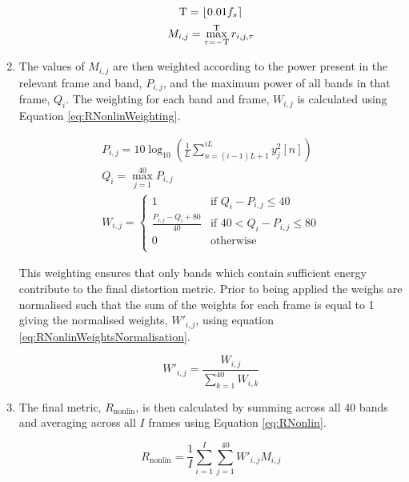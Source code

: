 \begin{enumerate}
					\begin{gather}
						\mathrm{T} = \left\lfloor0.01f_{s}\right\rceil \nonumber \\
						M_{i,j} = \max_{\tau = -\mathrm{T}}^{\mathrm{T}} r_{i,j,\tau}
						\label{eq:RNonlinMaxCrossCorrelation}
					\end{gather}

				\item The values of $M_{i,j}$ are then weighted according to the power present in the
					relevant frame and band, $P_{i,j}$, and the maximum power of all bands in that
					frame, $Q_{i}$. The weighting for each band and frame, $W_{i,j}$ is calculated using
					Equation \ref{eq:RNonlinWeighting}.

					\begin{gather}
						P_{i,j} = 10\log_{10} \left( \frac{1}{L} 
							\sum_{n=(i-1)L+1}^{iL} y_{j}^{2}[n]\right) \nonumber \\
						Q_{i} = \max_{j = 1}^{40} P_{i,j} \nonumber \\
						W_{i,j} = \begin{cases}
							1 & \text{if $Q_{i} - P_{i,j} \leq 40$} \\
							\frac{P_{i,j} - Q_{i} + 80}{40} & 
								\text{if $40 < Q_{i} - P_{i,j} \leq 80$} \\
							0 & \text{otherwise} \\
						\end{cases}
						\label{eq:RNonlinWeighting}
					\end{gather}

					This weighting ensures that only bands which contain sufficient energy contribute to
					the final distortion metric. Prior to being applied the weighs are normalised such
					that the sum of the weights for each frame is equal to 1 giving the normalised
					weights, $W'_{i,j}$, using equation \ref{eq:RNonlinWeightsNormalisation}.

					\begin{equation}
						W'_{i,j} = \frac{W_{i, j}}{\sum_{k = 1}^{40} W_{i,k}}
						\label{eq:RNonlinWeightsNormalisation}
					\end{equation}

				\item The final metric, $R_{\mathrm{nonlin}}$, is then calculated by summing across all 40
					bands and averaging across all $I$ frames using Equation \ref{eq:RNonlin}.

					\begin{equation}
						R_{\mathrm{nonlin}} = \frac{1}{I} \sum_{i = 1}^{I} \sum_{j = 1}^{40} 
									W'_{i,j}M_{i,j}
						\label{eq:RNonlin}
					\end{equation}

			\end{enumerate}

